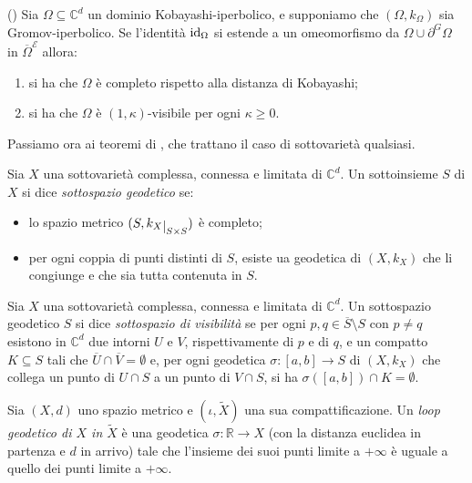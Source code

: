 \begin{thm}
    (\cite[Theorem 1.10]{BZ2}) Sia $\Omega\subseteq\mathbb{C}^d$ un dominio Kobayashi-iperbolico, e supponiamo che $(\Omega,k_\Omega)$ sia Gromov-iperbolico. Se l'identità $\operatorname{id}_\Omega$ si estende a un omeomorfismo da $\Omega\cup\partial^G\Omega$ in $\overline{\Omega}^\mathcal{E}$ allora:
    \begin{enumerate}[label={(\arabic*)}]
        \item si ha che $\Omega$ è completo rispetto alla distanza di Kobayashi;
        \item si ha che $\Omega$ è $(1,\kappa)$-visibile per ogni $\kappa\ge0$.
    \end{enumerate}
\end{thm}

Passiamo ora ai teoremi di \cite{CMS}, che trattano il caso di sottovarietà qualsiasi.

\begin{defn}
    Sia $X$ una sottovarietà complessa, connessa e limitata di $\mathbb{C}^d$. Un sottoinsieme $S$ di $X$ si dice \textit{sottospazio geodetico} se:
    \begin{itemize}
        \item lo spazio metrico $(S,k_X\restrict{S\times S})$ è completo;
        \item per ogni coppia di punti distinti di $S$, esiste ua geodetica di $(X,k_X)$ che li congiunge e che sia tutta contenuta in $S$.
    \end{itemize}
\end{defn}

\begin{defn}
    Sia $X$ una sottovarietà complessa, connessa e limitata di $\mathbb{C}^d$. Un sottospazio geodetico $S$ si dice \textit{sottospazio di visibilità} se per ogni $p,q\in\overline{S}\setminus S$ con $p\not=q$ esistono in $\mathbb{C}^d$ due intorni $U$ e $V$, rispettivamente di $p$ e di $q$, e un compatto $K\subseteq S$ tali che $\overline{U}\cap\overline{V}=\emptyset$ e, per ogni geodetica $\sigma:[a,b]\longrightarrow S$ di $(X,k_X)$ che collega un punto di $U\cap S$ a un punto di $V\cap S$, si ha $\sigma([a,b])\cap K=\emptyset$.
\end{defn}

\begin{defn}
    Sia $(X,d)$ uno spazio metrico e $(\iota,\tilde{X})$ una sua compattificazione. Un \textit{loop geodetico di $X$ in $\tilde{X}$} è una geodetica $\sigma:\mathbb{R}\longrightarrow X$ (con la distanza euclidea in partenza e $d$ in arrivo) tale che l'insieme dei suoi punti limite a $+\infty$ è uguale a quello dei punti limite a $+\infty$.
\end{defn}

